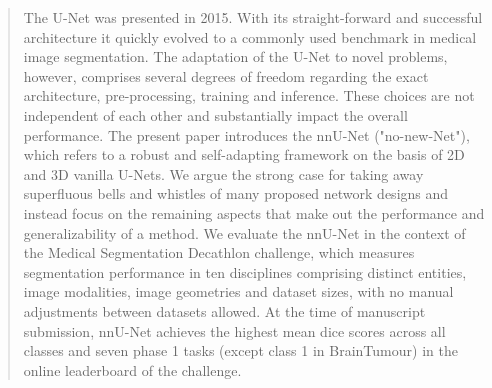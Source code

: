 \documentclass{templates/llncs} %
\begin{document}
\begin{abstract}


The U-Net was presented in 2015. With its straight-forward and successful architecture it quickly evolved to a commonly used benchmark in medical image segmentation. The adaptation of the U-Net to novel problems, however, comprises several degrees of freedom regarding the exact architecture, pre-processing, training and inference. These choices are not independent of each other and substantially impact the overall performance. The present paper introduces the nnU-Net ("no-new-Net"), which refers to a robust and self-adapting framework on the basis of 2D and 3D vanilla U-Nets. We argue the strong case for taking away superfluous bells and whistles of many proposed network designs and instead focus on the remaining aspects that make out the performance and generalizability of a method. We evaluate the nnU-Net in the context of the Medical Segmentation Decathlon challenge, which measures segmentation performance in ten disciplines comprising distinct entities, image modalities, image geometries and dataset sizes, with no manual adjustments between datasets allowed. At the time of manuscript submission, nnU-Net achieves the highest mean dice scores across all classes and seven phase 1 tasks (except class 1 in BrainTumour) in the online leaderboard of the challenge.

%
\end{abstract}
%
%
\end{document}
